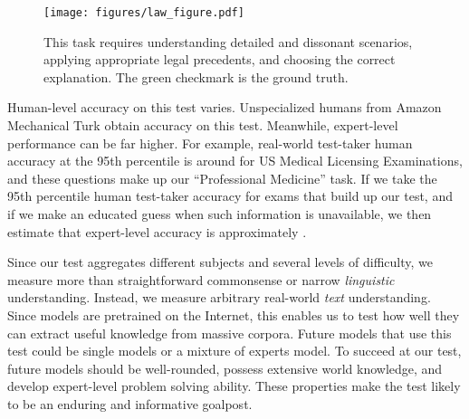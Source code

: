 \documentclass{article} \usepackage{iclr2021_conference, times}
\begin{document}
\begin{figure}[t]
    \centering
    \vspace{-17pt}
    \texttt{[image: figures/law\_figure.pdf]}
    \caption{This task requires understanding detailed and dissonant scenarios, applying appropriate legal precedents, and choosing the correct explanation. The green checkmark is the ground truth.}
    \label{fig:law}
    \vspace{-17pt}
\end{figure}

Human-level accuracy on this test varies. Unspecialized humans from Amazon Mechanical Turk obtain  accuracy on this test. Meanwhile, expert-level performance can be far higher. For example, real-world test-taker human accuracy at the 95th percentile is around  for US Medical Licensing Examinations, and these questions make up our ``Professional Medicine'' task. If we take the 95th percentile human test-taker accuracy for exams that build up our test, and if we make an educated guess when such information is unavailable, we then estimate that expert-level accuracy is approximately .

Since our test aggregates different subjects and several levels of difficulty, we measure more than straightforward commonsense or narrow \emph{linguistic} understanding. Instead, we measure arbitrary real-world \emph{text} understanding.
Since models are pretrained on the Internet, this enables us to test how well they can extract useful knowledge from massive corpora. Future models that use this test could be single models or a mixture of experts model.
To succeed at our test, future models should be well-rounded, possess extensive world knowledge, and develop expert-level problem solving ability.
These properties make the test likely to be an enduring and informative goalpost.
\end{document}
